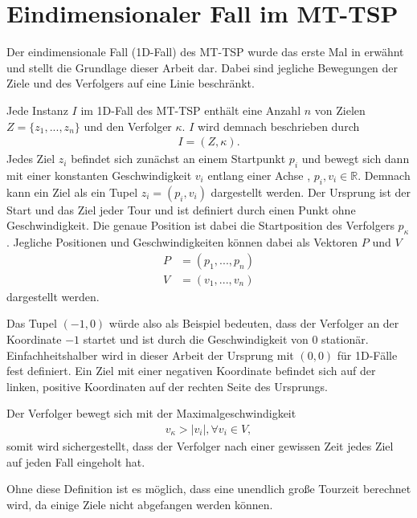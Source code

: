 \documentclass[german,version-2019-11]{uzl-thesis}
\begin{document}
\section{Eindimensionaler Fall im MT-TSP}
Der eindimensionale Fall (1D-Fall) des MT-TSP wurde das erste Mal in \cite{helvig} erwähnt und stellt die Grundlage dieser Arbeit dar. Dabei sind jegliche Bewegungen der Ziele und des Verfolgers auf eine Linie beschränkt. 
\begin{definition} 
\label{def:Instanz}
Jede Instanz $I$ im 1D-Fall des MT-TSP enthält eine Anzahl $n$ von Zielen $Z = \{z_1,...,z_n\}$ und den Verfolger $\kappa$. $I$ wird demnach beschrieben durch
\begin{align*}
I = (Z, \kappa).
\end{align*}
Jedes Ziel $z_i$ befindet sich zunächst an einem Startpunkt $p_i$ und bewegt sich dann mit einer konstanten Geschwindigkeit $v_i$ entlang einer Achse , $p_i, v_i \in\mathbb{R}$. Demnach kann ein Ziel als ein Tupel $z_i = (p_i, v_i)$ dargestellt werden. Der Ursprung ist der Start und das Ziel jeder Tour und ist definiert durch einen Punkt ohne Geschwindigkeit. Die genaue Position ist dabei die Startposition des Verfolgers $p_{\kappa}$. Jegliche Positionen und Geschwindigkeiten können dabei als Vektoren $P$ und $V$ 
\begin{align*}
P &= (p_1, ..., p_n)\\
V &= (v_1, ..., v_n)
\end{align*}\newpage\noindent
dargestellt werden.
\end{definition}\noindent
Das Tupel $(-1,0)$ würde also als Beispiel bedeuten, dass der Verfolger an der Koordinate $-1$ startet und ist durch die Geschwindigkeit von $0$ stationär. Einfachheitshalber wird in dieser Arbeit der Ursprung mit $(0,0)$ für 1D-Fälle fest definiert. Ein Ziel mit einer negativen Koordinate befindet sich auf der linken, positive Koordinaten auf der rechten Seite des Ursprungs. 

\begin{definition}
Der Verfolger bewegt sich mit der Maximalgeschwindigkeit 
\begin{align*}
v_{\kappa} > |v_i|, \forall v_i\in V,
\end{align*}
somit wird sichergestellt, dass der Verfolger nach einer gewissen Zeit jedes Ziel auf jeden Fall eingeholt hat.
\end{definition} \noindent
Ohne diese Definition ist es möglich, dass eine unendlich große Tourzeit berechnet wird, da einige Ziele nicht abgefangen werden können.
\end{document}
